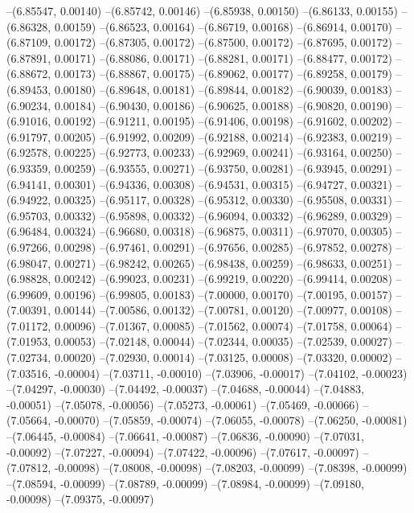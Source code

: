 --(6.85547, 0.00140)
--(6.85742, 0.00146)
--(6.85938, 0.00150)
--(6.86133, 0.00155)
--(6.86328, 0.00159)
--(6.86523, 0.00164)
--(6.86719, 0.00168)
--(6.86914, 0.00170)
--(6.87109, 0.00172)
--(6.87305, 0.00172)
--(6.87500, 0.00172)
--(6.87695, 0.00172)
--(6.87891, 0.00171)
--(6.88086, 0.00171)
--(6.88281, 0.00171)
--(6.88477, 0.00172)
--(6.88672, 0.00173)
--(6.88867, 0.00175)
--(6.89062, 0.00177)
--(6.89258, 0.00179)
--(6.89453, 0.00180)
--(6.89648, 0.00181)
--(6.89844, 0.00182)
--(6.90039, 0.00183)
--(6.90234, 0.00184)
--(6.90430, 0.00186)
--(6.90625, 0.00188)
--(6.90820, 0.00190)
--(6.91016, 0.00192)
--(6.91211, 0.00195)
--(6.91406, 0.00198)
--(6.91602, 0.00202)
--(6.91797, 0.00205)
--(6.91992, 0.00209)
--(6.92188, 0.00214)
--(6.92383, 0.00219)
--(6.92578, 0.00225)
--(6.92773, 0.00233)
--(6.92969, 0.00241)
--(6.93164, 0.00250)
--(6.93359, 0.00259)
--(6.93555, 0.00271)
--(6.93750, 0.00281)
--(6.93945, 0.00291)
--(6.94141, 0.00301)
--(6.94336, 0.00308)
--(6.94531, 0.00315)
--(6.94727, 0.00321)
--(6.94922, 0.00325)
--(6.95117, 0.00328)
--(6.95312, 0.00330)
--(6.95508, 0.00331)
--(6.95703, 0.00332)
--(6.95898, 0.00332)
--(6.96094, 0.00332)
--(6.96289, 0.00329)
--(6.96484, 0.00324)
--(6.96680, 0.00318)
--(6.96875, 0.00311)
--(6.97070, 0.00305)
--(6.97266, 0.00298)
--(6.97461, 0.00291)
--(6.97656, 0.00285)
--(6.97852, 0.00278)
--(6.98047, 0.00271)
--(6.98242, 0.00265)
--(6.98438, 0.00259)
--(6.98633, 0.00251)
--(6.98828, 0.00242)
--(6.99023, 0.00231)
--(6.99219, 0.00220)
--(6.99414, 0.00208)
--(6.99609, 0.00196)
--(6.99805, 0.00183)
--(7.00000, 0.00170)
--(7.00195, 0.00157)
--(7.00391, 0.00144)
--(7.00586, 0.00132)
--(7.00781, 0.00120)
--(7.00977, 0.00108)
--(7.01172, 0.00096)
--(7.01367, 0.00085)
--(7.01562, 0.00074)
--(7.01758, 0.00064)
--(7.01953, 0.00053)
--(7.02148, 0.00044)
--(7.02344, 0.00035)
--(7.02539, 0.00027)
--(7.02734, 0.00020)
--(7.02930, 0.00014)
--(7.03125, 0.00008)
--(7.03320, 0.00002)
--(7.03516, -0.00004)
--(7.03711, -0.00010)
--(7.03906, -0.00017)
--(7.04102, -0.00023)
--(7.04297, -0.00030)
--(7.04492, -0.00037)
--(7.04688, -0.00044)
--(7.04883, -0.00051)
--(7.05078, -0.00056)
--(7.05273, -0.00061)
--(7.05469, -0.00066)
--(7.05664, -0.00070)
--(7.05859, -0.00074)
--(7.06055, -0.00078)
--(7.06250, -0.00081)
--(7.06445, -0.00084)
--(7.06641, -0.00087)
--(7.06836, -0.00090)
--(7.07031, -0.00092)
--(7.07227, -0.00094)
--(7.07422, -0.00096)
--(7.07617, -0.00097)
--(7.07812, -0.00098)
--(7.08008, -0.00098)
--(7.08203, -0.00099)
--(7.08398, -0.00099)
--(7.08594, -0.00099)
--(7.08789, -0.00099)
--(7.08984, -0.00099)
--(7.09180, -0.00098)
--(7.09375, -0.00097)
